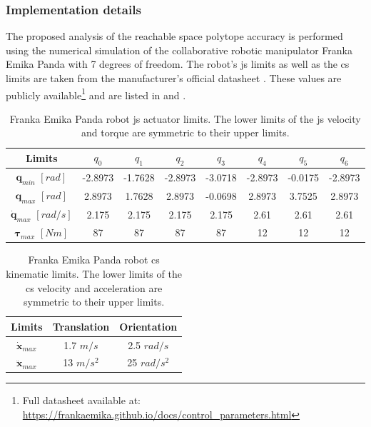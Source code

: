 \subsubsection{Implementation details}

The proposed analysis of the reachable space polytope accuracy is performed using the numerical simulation of the collaborative robotic manipulator {Franka Emika Panda} with 7 degrees of freedom. The robot's \gls{js} limits as well as the \gls{cs} limits are taken from the manufacturer's official datasheet \cite{franka_maual}. These values are publicly available\footnote{\label{note:franka}Full datasheet available at: \url{https://frankaemika.github.io/docs/control_parameters.html}} and are listed in  and .

\begin{table}[h!]
    \centering
    \begin{tabular}{|c|ccccccc|}
        \hline
        Limits & $q_0$ & $q_1$ & $q_2$ & $q_3$ & $q_4$ & $q_5$ & $q_6$ \\
        \hline
        ${\bm{q}}_{min}$ $[{rad}]$ & -2.8973 & -1.7628 & -2.8973 & -3.0718 & -2.8973 & -0.0175 & -2.8973\\
        ${\bm{q}}_{max}$ $[{rad}]$ & 2.8973 & 1.7628 & 2.8973 & -0.0698 & 2.8973 & 3.7525 & 2.8973\\
        $\dot{\bm{q}}_{max}$ $[{rad}/{s}]$ & 2.175 & 2.175 & 2.175 & 2.175 & 2.61 & 2.61 & 2.61 \\
        $\bm{\tau}_{max}$  $[Nm]$ & 87 & 87 & 87 & 87 & 12 & 12 & 12 \\
        \hline
    \end{tabular}
    \caption{Franka Emika Panda robot \gls{js} actuator limits. The lower limits of the \gls{js} velocity and torque are symmetric to their upper limits.}
    \label{tab:panda_limits_js_hfr}
\end{table}

	
\begin{table}[h]
    \centering
    \begin{tabular}{|c|cc|}
        \hline
        Limits & Translation & Orientation \\
        \hline
        $\dot{\bm{x}}_{max}$ & 1.7 $m/s$ & 2.5 $rad/s$ \\
        $\ddot{\bm{x}}_{max}$ & 13 $m/s^2$ & 25 $rad/s^{2}$\\
        \hline
    \end{tabular}
    \caption{Franka Emika Panda robot \gls{cs} kinematic limits. The lower limits of the \gls{cs} velocity and acceleration are symmetric to their upper limits.}
    \label{table:franka_limits_cs_hfr}
\end{table}

